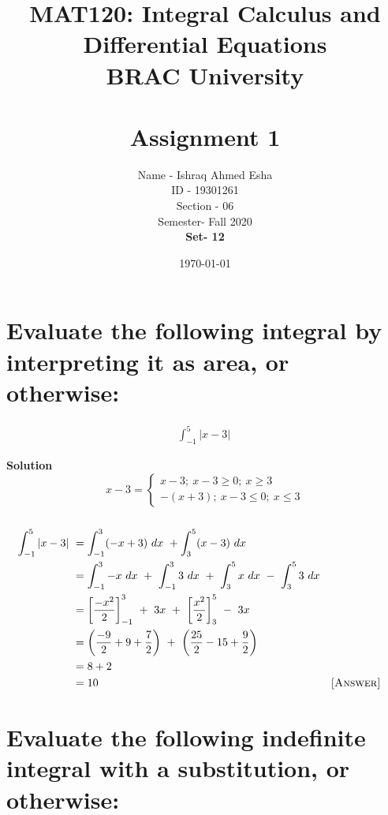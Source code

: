 \documentclass[12pt]{article}
\begin{document}
\title{MAT120: Integral Calculus and
Differential Equations \\
BRAC University \\\\
\textbf{Assignment 1}}

\author{Name - Ishraq Ahmed Esha \\ ID - 19301261 \\ Section - 06 \\ Semester- Fall 2020 \\ \textbf{Set- 12}}
\date{\today}
\maketitle


\section{Evaluate the following integral by interpreting it as area, or otherwise:}


\begin{align*}
    \int _{-1}^5\left|x-3\right|\:
\end{align*}

\textbf{Solution}
\[ x-3 =
  \begin{cases}
    x-3;\ x-3\geq{0};\ x\geq{3}\\
    -(x+3);\ x-3\leq{0};\ x\leq{3}
  \end{cases}
\]\\
\begin{align*}
    \int _{-1}^5\left|x-3\right|\
    &=\int _{-1}^3 (-x+3)\ dx\ +\int_{3}^5 (x-3)\ dx\\
    &=\int _{-1}^3 -x\ dx\ +\ \int _{-1}^3 3\ dx\ +\ \int _{3}^5 x\ dx\ -\ \int _{3}^5 3\ dx\\
    &=\left[\frac{-x^2}{2} \right]_{-1}^3 \ +\ 3x\ +\ \left[\frac{x^2}{2} \right]^5_3\ -\ 3x\\
    &=\left(\frac{-9}{2}+9+\frac{7}{2}\right)\ +\ \left(\frac{25}{2}-15+\frac{9}{2}\right)\\
    &=8+2\\
    &=10
    & & \textsc{[Answer]}
\end{align*}
\pagebreak

\section{Evaluate the following indefinite integral with a substitution, or otherwise:}
\end{document}

